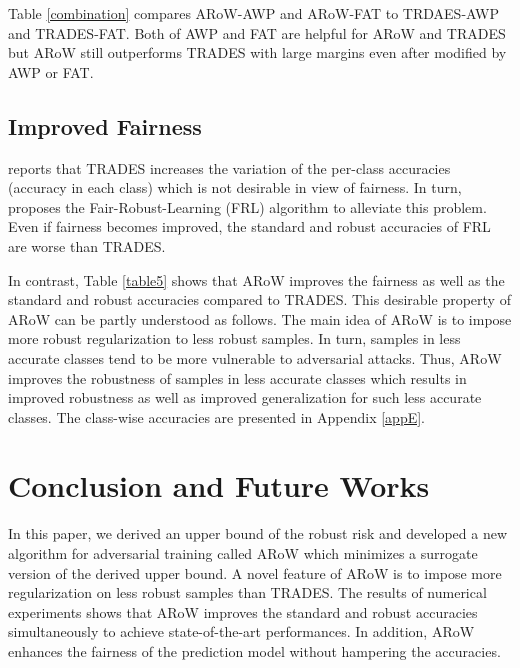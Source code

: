 \documentclass[nohyperref]{article}
\theoremstyle{plain}
\theoremstyle{definition}
\theoremstyle{remark}
\begin{document}
Table \ref{combination} compares ARoW-AWP and ARoW-FAT to TRDAES-AWP and TRADES-FAT.
Both of AWP and FAT are helpful for ARoW and TRADES but
ARoW still outperforms TRADES with large margins even after modified by AWP or FAT.





\subsection{Improved Fairness}
\label{fairness}
 
\citet{xu2021to} reports that TRADES \citep{zhang2019theoretically} increases
the variation of the per-class accuracies (accuracy in each class) which
is not desirable in view of fairness. In turn, \citet{xu2021to} proposes the Fair-Robust-Learning (FRL) algorithm to alleviate this problem. Even if
fairness becomes improved, the standard and robust accuracies of FRL 
are worse than TRADES.

In contrast, Table \ref{table5} shows that ARoW improves the fairness
as well as the standard and robust accuracies compared to TRADES.
This desirable property of ARoW can be partly understood as follows.
The main idea of ARoW is to impose more robust regularization
to less robust samples.
In turn, samples in less accurate classes tend to be more vulnerable to adversarial attacks. Thus, ARoW improves the robustness of samples in less accurate classes which results in improved robustness as well as improved generalization for such less accurate classes.
The class-wise accuracies are presented in Appendix \ref{appE}.

\section{Conclusion and Future Works}

In this paper, we derived an upper bound of the robust risk and developed a new algorithm for adversarial training called ARoW which minimizes a surrogate version of the derived upper bound.
A novel feature of ARoW is to impose more regularization on less robust samples than TRADES.
The results of numerical experiments shows that ARoW improves the standard and robust accuracies
simultaneously to achieve state-of-the-art performances. In addition, ARoW enhances
the fairness of the prediction model without hampering the accuracies.
\end{document}
